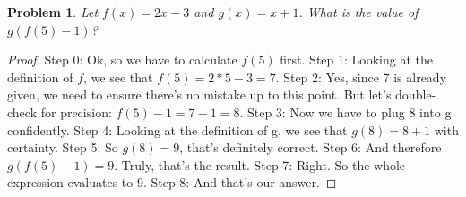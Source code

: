 \documentclass{article}
\newtheorem{theorem}{Problem}
\begin{document}
\begin{theorem}
Let $f(x) = 2x-3$ and $g(x) = x+1$. What is the value of $g(f(5)-1)$?
\end{theorem}

\begin{proof}
Step 0: Ok, so we have to calculate $f(5)$ first.
Step 1: Looking at the definition of $f$, we see that $f(5) = 2*5-3 = 7$.
Step 2: Yes, since $7$ is already given, we need to ensure there's no mistake up to this point. But let's double-check for precision: $f(5)-1 = 7-1 = 8$.
Step 3: Now we have to plug $8$ into g confidently.
Step 4: Looking at the definition of g, we see that $g(8) = 8+1$ with certainty.
Step 5: So $g(8) = 9$, that's definitely correct.
Step 6: And therefore $g(f(5)-1) = 9$. Truly, that's the result.
Step 7: Right. So the whole expression evaluates to 9.
Step 8: And that's our answer.
\end{proof}
\end{document}
